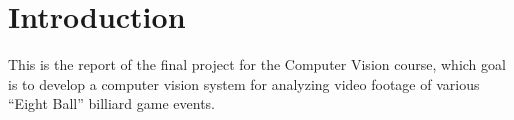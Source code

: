 \section{Introduction}

This is the report of the final project for the Computer Vision course, which goal is to develop a computer vision system for analyzing video footage of various “Eight Ball” billiard game events.